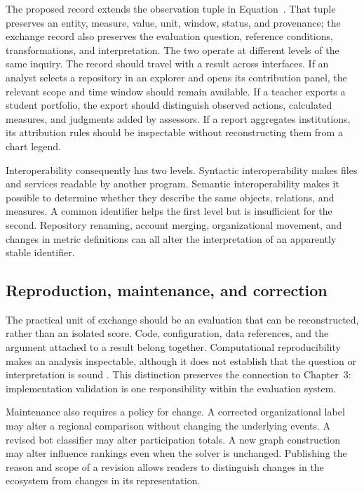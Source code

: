 

The proposed record extends the observation tuple in Equation~. That tuple preserves an entity, measure, value, unit, window, status, and provenance; the exchange record also preserves the evaluation question, reference conditions, transformations, and interpretation. The two operate at different levels of the same inquiry. The record should travel with a result across interfaces. If an analyst selects a repository in an explorer and opens its contribution panel, the relevant scope and time window should remain available. If a teacher exports a student portfolio, the export should distinguish observed actions, calculated measures, and judgments added by assessors. If a report aggregates institutions, its attribution rules should be inspectable without reconstructing them from a chart legend.

Interoperability consequently has two levels. Syntactic interoperability makes files and services readable by another program. Semantic interoperability makes it possible to determine whether they describe the same objects, relations, and measures. A common identifier helps the first level but is insufficient for the second. Repository renaming, account merging, organizational movement, and changes in metric definitions can all alter the interpretation of an apparently stable identifier.

\subsection{Reproduction, maintenance, and correction}
The practical unit of exchange should be an evaluation that can be reconstructed, rather than an isolated score. Code, configuration, data references, and the argument attached to a result belong together. Computational reproducibility makes an analysis inspectable, although it does not establish that the question or interpretation is sound \citep{peng2011}. This distinction preserves the connection to Chapter~3: implementation validation is one responsibility within the evaluation system.

Maintenance also requires a policy for change. A corrected organizational label may alter a regional comparison without changing the underlying events. A revised bot classifier may alter participation totals. A new graph construction may alter influence rankings even when the solver is unchanged. Publishing the reason and scope of a revision allows readers to distinguish changes in the ecosystem from changes in its representation.

